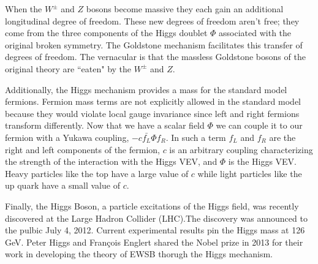When the $W^\pm$ and $Z$ bosons become massive they each gain an additional longitudinal degree of freedom.
These new degrees of freedom aren't free; they come from the three components of the Higgs doublet $\Phi$ associated with the original broken symmetry.
The Goldstone mechanism facilitates this transfer of degrees of freedom.
The vernacular is that the massless Goldstone bosons of the original theory are ``eaten" by the $W^\pm$ and $Z$.


Additionally, the Higgs mechanism provides a mass for the standard model fermions.
Fermion mass terms are not explicitly allowed in the standard model because they would violate local gauge invariance since left and right fermions transform differently.
Now that we have a scalar field $\Phi$ we can couple it to our fermion with a Yukawa coupling, $-c\bar{f_L}\Phi f_R$.
In such a term $f_L$ and $f_R$ are the right and left components of the fermion, $c$ is an arbitrary coupling characterizing the strength of the interaction with the Higgs VEV, and $\Phi$ is the Higgs VEV.
Heavy particles like the top have a large value of $c$ while light particles like the up quark have a small value of $c$.

Finally, the Higgs Boson, a particle excitations of the Higgs field, was recently discovered at the Large Hadron Collider (LHC).The discovery was announced to the pulbic July 4, 2012.
Current experimental results pin the Higgs mass at 126 GeV.
Peter Higgs and François Englert shared the Nobel prize in 2013 for their work in developing the theory of EWSB thorugh the Higgs mechanism.
